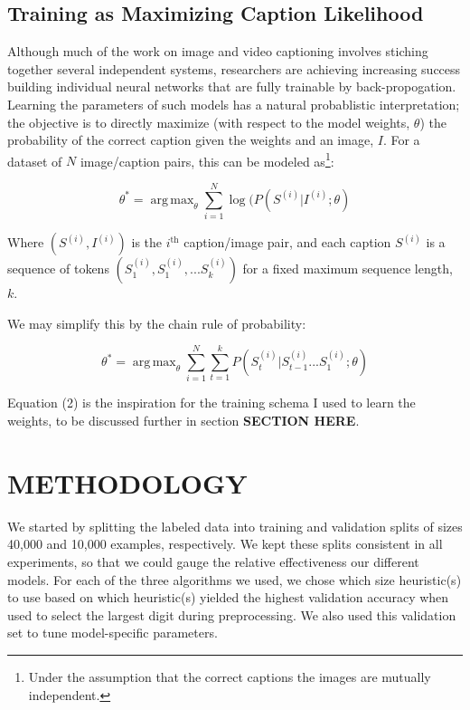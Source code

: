 \documentclass[letterpaper, 10 pt, conference]{ieeeconf}
\DeclareMathOperator*{\argmax}{arg\,max}
\begin{document}
\subsection{Training as Maximizing Caption Likelihood}

Although much of the work on image and video captioning involves stiching together several independent systems, researchers are achieving increasing success building individual neural networks that are fully trainable by back-propogation. Learning the parameters of such models has a natural probablistic interpretation; the objective is to directly maximize (with respect to the model weights, $\theta$) the probability of the correct caption given the weights and an image, $I$. For a dataset of $N$ image/caption pairs, this can be modeled as\footnote{Under the assumption that the correct captions the images are mutually independent.}:

\begin{equation}
\theta^* = \argmax_{\theta}{\sum_{i = 1}^N{\log(P(S^{(i)}|I^{(i)}; \theta)}}
\end{equation} 

Where $(S^{(i)}, I^{(i)})$ is the $i^{\text{th}}$ caption/image pair, and each caption $S^{(i)}$ is a sequence of tokens $(S^{(i)}_1, S^{(i)}_1, ... S^{(i)}_k)$ for a fixed maximum sequence length, $k$. 

We may simplify this by the chain rule of probability:

\begin{equation}
\theta^* = \argmax_{\theta}{\sum_{i = 1}^N{\sum_{t = 1}^k{P(S_t^{(i)}|S_{t - 1}^{(i)} ... S_{1}^{(i)}; \theta)}}}
\end{equation} 

Equation (2) is the inspiration for the training schema I used to learn the weights, to be discussed further in section \textbf{SECTION HERE}.

\section{METHODOLOGY}

We started by splitting the labeled data into training and validation splits of sizes 40,000 and 10,000 examples, respectively. We kept these splits consistent in all experiments, so that we could gauge the relative effectiveness our different models. For each of the three algorithms we used, we chose which size heuristic(s) to use based on which heuristic(s) yielded the highest validation accuracy when used to select the largest digit during preprocessing. We also used this validation set to tune model-specific parameters.
\end{document}
